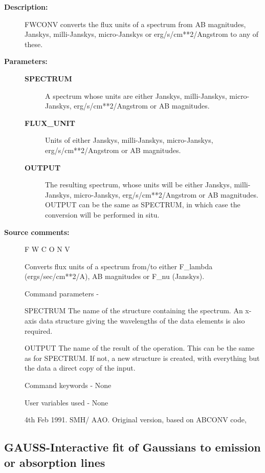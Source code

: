 \begin{description}
\begin{description}
\item [\textbf{Description:}]
 FWCONV converts the flux units of a spectrum from AB magnitudes,
 Janskys, milli-Janskys, micro-Janskys or erg/s/cm**2/Angstrom to
 any of these.

\item [\textbf{Parameters:}]
\begin{description}
\item [\textbf{SPECTRUM}]
 A spectrum whose units are either Janskys,
 milli-Janskys, micro-Janskys, erg/s/cm**2/Angstrom
 or AB magnitudes.
\item [\textbf{FLUX\_UNIT}]
 Units of either Janskys, milli-Janskys,
 micro-Janskys, erg/s/cm**2/Angstrom or AB magnitudes.
\item [\textbf{OUTPUT}]
 The resulting spectrum, whose units will be either
 Janskys, milli-Janskys, micro-Janskys, erg/s/cm**2/Angstrom or
 AB magnitudes.  OUTPUT can be the same as SPECTRUM, in which
 case the conversion will be performed in situ.
\end{description}

\item [\textbf{Source comments:}]
\begin{terminalv}
 F W C O N V

 Converts flux units of a spectrum from/to either
 F_lambda (ergs/sec/cm**2/A), AB magnitudes or F_nu (Janskys).

 Command parameters -

 SPECTRUM The name of the structure containing the spectrum.
          An x-axis data structure giving the wavelengths of the
          data elements is also required.

 OUTPUT   The name of the result of the operation.  This can
          be the same as for SPECTRUM. If not, a new structure
          is created, with everything but the data a direct
          copy of the input.

 Command keywords  - None

 User variables used - None

 4th  Feb 1991.  SMH/ AAO.  Original version, based on ABCONV code,
\end{terminalv}
\end{description}
\subsection{GAUSS-\label{GAUSS}Interactive fit of Gaussians to emission or absorption lines}
\begin{description}


\end{description}
\end{description}
